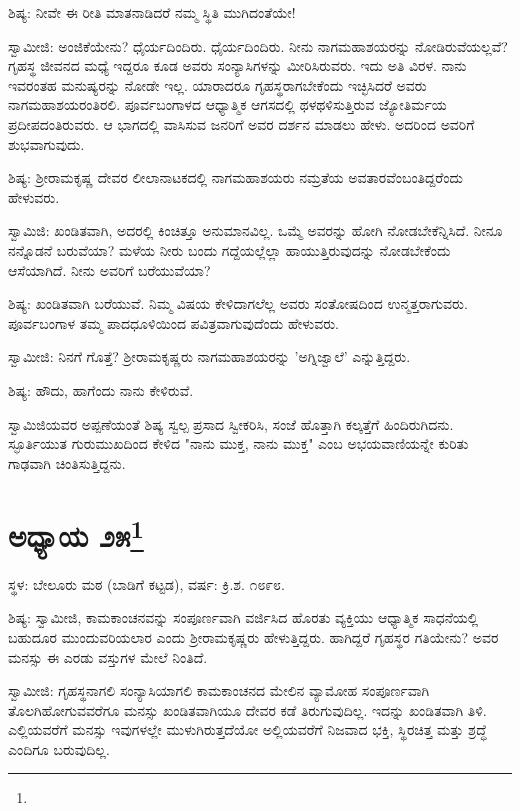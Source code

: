 ಶಿಷ್ಯ: ನೀವೇ ಈ ರೀತಿ ಮಾತನಾಡಿದರೆ ನಮ್ಮ ಸ್ಥಿತಿ ಮುಗಿದಂತೆಯೇ!

ಸ್ವಾಮೀಜಿ: ಅಂಜಿಕೆಯೇನು? ಧೈರ್ಯದಿಂದಿರು. ಧೈರ್ಯದಿಂದಿರು. ನೀನು ನಾಗಮಹಾಶಯರನ್ನು ನೋಡಿರುವೆಯಲ್ಲವೆ? ಗೃಹಸ್ಥ ಜೀವನದ ಮಧ್ಯೆ ಇದ್ದರೂ ಕೂಡ ಅವರು ಸಂನ್ಯಾಸಿಗಳನ್ನು ಮೀರಿಸಿರುವರು. ಇದು ಅತಿ ವಿರಳ. ನಾನು ಇವರಂತಹ ಮನುಷ್ಯರನ್ನು ನೋಡೇ ಇಲ್ಲ. ಯಾರಾದರೂ ಗೃಹಸ್ಥರಾಗಬೇಕೆಂದು ಇಚ್ಛಿಸಿದರೆ ಅವರು ನಾಗಮಹಾಶಯರಂತಿರಲಿ. ಪೂರ್ವಬಂಗಾಳದ ಆಧ್ಯಾತ್ಮಿಕ ಆಗಸದಲ್ಲಿ ಥಳಥಳಿಸುತ್ತಿರುವ ಜ್ಯೋತಿರ್ಮಯ ಪ್ರದೀಪದಂತಿರುವರು. ಆ ಭಾಗದಲ್ಲಿ ವಾಸಿಸುವ ಜನರಿಗೆ ಅವರ ದರ್ಶನ ಮಾಡಲು ಹೇಳು. ಅದರಿಂದ ಅವರಿಗೆ ಶುಭವಾಗುವುದು.

ಶಿಷ್ಯ: ಶ‍್ರೀರಾಮಕೃಷ್ಣ ದೇವರ ಲೀಲಾನಾಟಕದಲ್ಲಿ ನಾಗಮಹಾಶಯರು ನಮ್ರತೆಯ ಅವತಾರವೆಂಬಂತಿದ್ದರೆಂದು ಹೇಳುವರು.

ಸ್ವಾಮಿಜಿ: ಖಂಡಿತವಾಗಿ, ಅದರಲ್ಲಿ ಕಿಂಚಿತ್ತೂ ಅನುಮಾನವಿಲ್ಲ. ಒಮ್ಮೆ ಅವರನ್ನು ಹೋಗಿ ನೋಡಬೇಕೆನ್ನಿಸಿದೆ. ನೀನೂ ನನ್ನೊಡನೆ ಬರುವೆಯಾ? ಮಳೆಯ ನೀರು ಬಂದು ಗದ್ದೆಯಲ್ಲೆಲ್ಲಾ ಹಾಯುತ್ತಿರುವುದನ್ನು ನೋಡಬೇಕೆಂದು ಆಸೆಯಾಗಿದೆ. ನೀನು ಅವರಿಗೆ ಬರೆಯುವೆಯಾ?

ಶಿಷ್ಯ: ಖಂಡಿತವಾಗಿ ಬರೆಯುವೆ. ನಿಮ್ಮ ವಿಷಯ ಕೇಳಿದಾಗಲೆಲ್ಲ ಅವರು ಸಂತೋಷದಿಂದ ಉನ್ಮತ್ತರಾಗುವರು. ಪೂರ್ವಬಂಗಾಳ ತಮ್ಮ ಪಾದಧೂಳಿಯಿಂದ ಪವಿತ್ರವಾಗುವುದೆಂದು ಹೇಳುವರು.

ಸ್ವಾಮೀಜಿ: ನಿನಗೆ ಗೊತ್ತೆ? ಶ‍್ರೀರಾಮಕೃಷ್ಣರು ನಾಗಮಹಾಶಯರನ್ನು 'ಅಗ್ನಿಜ್ವಾಲೆ' ಎನ್ನುತ್ತಿದ್ದರು.

ಶಿಷ್ಯ: ಹೌದು, ಹಾಗೆಂದು ನಾನು ಕೇಳಿರುವೆ.

ಸ್ವಾಮಿಜಿಯವರ ಅಪ್ಪಣೆಯಂತೆ ಶಿಷ್ಯ ಸ್ವಲ್ಪ ಪ್ರಸಾದ ಸ್ವೀಕರಿಸಿ, ಸಂಜೆ ಹೊತ್ತಾಗಿ ಕಲ್ಕತ್ತೆಗೆ ಹಿಂದಿರುಗಿದನು. ಸ್ಫೂರ್ತಿಯುತ ಗುರುಮುಖದಿಂದ ಕೇಳಿದ "ನಾನು ಮುಕ್ತ, ನಾನು ಮುಕ್ತ" ಎಂಬ ಅಭಯವಾಣಿಯನ್ನೇ ಕುರಿತು ಗಾಢವಾಗಿ ಚಿಂತಿಸುತ್ತಿದ್ದನು.

\newpage

\chapter[ಅಧ್ಯಾಯ ೨೫]{ಅಧ್ಯಾಯ ೨೫\protect\footnote{}}

\begin{center}
ಸ್ಥಳ: ಬೇಲೂರು ಮಠ (ಬಾಡಿಗೆ ಕಟ್ಟಡ), ವರ್ಷ: ಕ್ರಿ.ಶ. ೧೮೯೮.
\end{center}

ಶಿಷ್ಯ: ಸ್ವಾಮೀಜಿ, ಕಾಮಕಾಂಚನವನ್ನು ಸಂಪೂರ್ಣವಾಗಿ ವರ್ಜಿಸಿದ ಹೊರತು ವ್ಯಕ್ತಿಯು ಆಧ್ಯಾತ್ಮಿಕ ಸಾಧನೆಯಲ್ಲಿ ಬಹುದೂರ ಮುಂದುವರಿಯಲಾರ ಎಂದು ಶ‍್ರೀರಾಮಕೃಷ್ಣರು ಹೇಳುತ್ತಿದ್ದರು. ಹಾಗಿದ್ದರೆ ಗೃಹಸ್ಥರ ಗತಿಯೇನು? ಅವರ ಮನಸ್ಸು ಈ ಎರಡು ವಸ್ತುಗಳ ಮೇಲೆ ನಿಂತಿದೆ.

ಸ್ವಾಮೀಜಿ: ಗೃಹಸ್ಥನಾಗಲಿ ಸಂನ್ಯಾಸಿಯಾಗಲಿ ಕಾಮಕಾಂಚನದ ಮೇಲಿನ ವ್ಯಾಮೋಹ ಸಂಪೂರ್ಣವಾಗಿ ತೊಲಗಿಹೋಗುವವರೆಗೂ ಮನಸ್ಸು ಖಂಡಿತವಾಗಿಯೂ ದೇವರ ಕಡೆ ತಿರುಗುವುದಿಲ್ಲ. ಇದನ್ನು ಖಂಡಿತವಾಗಿ ತಿಳಿ. ಎಲ್ಲಿಯವರೆಗೆ ಮನಸ್ಸು ಇವುಗಳಲ್ಲೇ ಮುಳುಗಿರುತ್ತದೆಯೋ ಅಲ್ಲಿಯವರೆಗೆ ನಿಜವಾದ ಭಕ್ತಿ, ಸ್ಥಿರಚಿತ್ತ ಮತ್ತು ಶ್ರದ್ಧೆ ಎಂದಿಗೂ ಬರುವುದಿಲ್ಲ.

